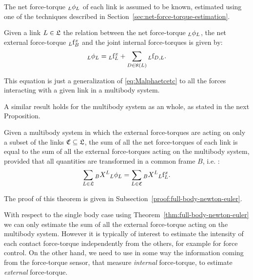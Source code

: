 \begin{assumption}
The net force-torque $\hspace{0em}_L \phi_L$ of each link is assumed to be known, estimated using one of the techniques described in Section~\ref{sec:net-force-torque-estimation}. 
\end{assumption}


\begin{property}
\label{prop:ne-for-link-in-multibody}
Given a link $L \in \mathfrak{L}$ the relation between the net force-torque $\hspace{0em}_L \phi_L$,  the net external force-torque $\hspace{0em}_L {\rm f}^x_B$ and the joint internal force-torques is given by:
\begin{equation}
\label{eq:ne-for-link-in-multibody}
   \hspace{0em}_L \phi_L = \hspace{0em}_L {\rm f}^x_L + \sum_{D \in \aleph(L)} \hspace{0em}_L {\rm f}_{D,L}.
\end{equation}
\end{property}
This equation is just a generalization of \eqref{eq:Malphaetcetc} to all the forces interacting with a given link in a multibody system. 

A similar result holds for the multibody system as an whole, as stated in the next Proposition. 
\begin{theorem} 
\label{thm:full-body-newton-euler}
Given a multibody system in which the external force-torques are acting on only a subset of the links $\mathfrak{C} \subseteq \mathfrak{L}$, the sum of all the net force-torques of each link is equal to the sum of all the external force-torques acting on the multibody system, provided that all quantities are transformed in a common frame $B$, i.e. :
\begin{equation}
    \label{eq:NEforEstimationCompleteModel}
    \sum_{L \in \mathfrak{L}}  \hspace{0em}_B X^L \hspace{0em}_L \phi_L = \sum_{L \in \mathfrak{C}} \hspace{0em}_B X^L \hspace{0em}_L {\rm f}^x_L .
\end{equation}
\end{theorem}
The proof of this theorem is given in Subsection~\ref{proof:full-body-newton-euler}.

With respect to the single body case using Theorem~\ref{thm:full-body-newton-euler} we can only estimate the sum of all the external force-torque acting on the multibody system. However it is typically of interest to estimate the intensity of each contact force-torque independently from the others, for example for force control. On the other hand, we need to use in some way the information coming from the force-torque sensor, that measure \emph{internal} force-torque, to estimate \emph{external} force-torque. 


